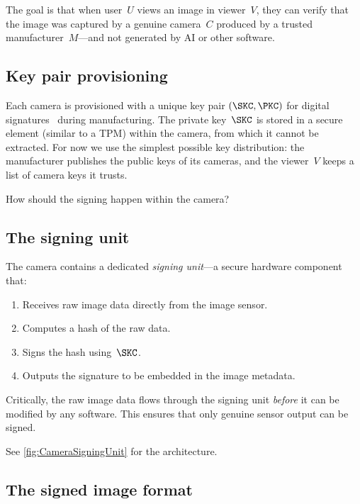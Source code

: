 The goal is that when user~\(U\) views an image in viewer~\(V\), they can
verify that the image was captured by a genuine camera~\(C\) produced by a
trusted manufacturer~\(M\)---and not generated by AI or other software.

\subsection{Key pair provisioning}

Each camera is provisioned with a unique key pair \((\SKC, \PKC)\) for
digital signatures~\autocite{DiffieHellman,RSA1978} during
manufacturing.
The private key~\(\SKC\) is stored in a secure element (similar to a
\ac{TPM}) within the camera, from which it cannot be extracted.
For now we use the simplest possible key distribution: the manufacturer
publishes the public keys of its cameras, and the viewer~\(V\) keeps a
list of camera keys it trusts.

\begin{exercise}
  How should the signing happen within the camera?
\end{exercise}

\subsection{The signing unit}

The camera contains a dedicated \emph{signing unit}---a secure hardware
component that:
\begin{enumerate}
  \item Receives raw image data directly from the image sensor.
  \item Computes a hash of the raw data.
  \item Signs the hash using~\(\SKC\).
  \item Outputs the signature to be embedded in the image metadata.
\end{enumerate}

Critically, the raw image data flows through the signing unit \emph{before}
it can be modified by any software.
This ensures that only genuine sensor output can be signed.

See \cref{fig:CameraSigningUnit} for the architecture.

\subsection{The signed image format}\label{CameraSignedImageFormat}

